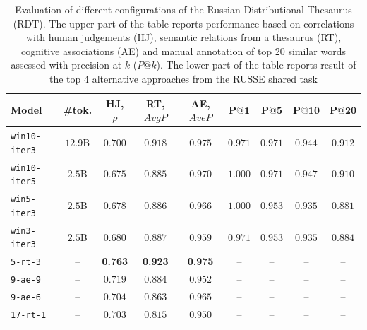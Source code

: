 \documentclass[runningheads,a4paper]{llncs}
\begin{document}

\begin{table}[ht]
\centering
\caption{Evaluation of different configurations of the Russian Distributional Thesaurus (RDT). The upper part of the table reports performance based on correlations with human judgements (HJ), semantic relations from a thesaurus (RT), cognitive associations (AE) and manual annotation of top 20 similar words assessed with precision at $k$ ($P@k$). The lower part of the table reports result of the top 4 alternative approaches from the RUSSE shared task}
\label{tab:evaluation}
\footnotesize
\begin{tabular}{lc|ccc|cccc}\toprule
\textbf{Model} & \textbf{\#tok.} & \textbf{HJ, $\rho$} & \textbf{RT, $AvgP$} & \textbf{AE, $AveP$} & $\mathbf{P@1}$ & $\mathbf{P@5}$ & $\mathbf{P@10}$ & $\mathbf{P@20}$ \\ \midrule
\texttt{win10-iter3} & $12.9$B & $\mathbf{0.700}$ & $\mathbf{0.918}$ & $\mathbf{0.975}$ & $0.971$          & $\mathbf{0.971}$ & $0.944$          & $\mathbf{0.912}$ \\
\texttt{win10-iter5} & $2.5$B  & $0.675$          & $0.885$          & $0.970$          & $\mathbf{1.000}$ & $\mathbf{0.971}$ & $\mathbf{0.947}$ & $0.910$          \\
\texttt{win5-iter3}  & $2.5$B  & $0.678$          & $0.886$          & $0.966$          & $\mathbf{1.000}$ & $0.953$          & $0.935$          & $0.881$          \\
\texttt{win3-iter3}  & $2.5$B  & $0.680$          & $0.887$          & $0.959$          & $0.971$          & $0.953$          & $0.935$          & $0.884$          \\ \midrule
\texttt{5-rt-3}~\cite{Lopukhin:15}  & --  & \bf 0.763          & \bf 0.923          & \bf 0.975          & --          & --          & --          & --          \\
\texttt{9-ae-9}~\cite{Panchenko:15}  & --  & $0.719$          & $0.884$          & $0.952$          & --          & --          & --          & --          \\
\texttt{9-ae-6}~\cite{Panchenko:15}  & --  & $0.704$          & $0.863$          & $0.965$          & --          & --          & --          & --          \\
\texttt{17-rt-1}~\cite{Panchenko:15}  & --  & $0.703$          & $0.815$          & $0.950$          & --          & --          & --          & --          \\
\bottomrule
\end{tabular}
\end{table}
\end{document}
